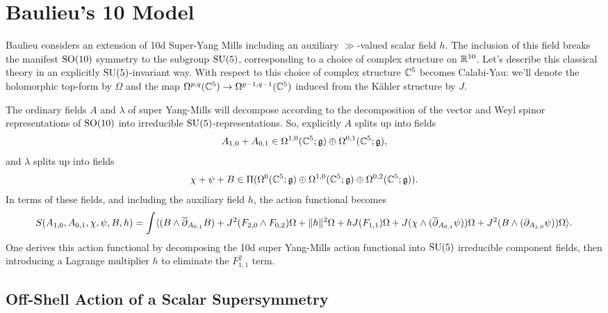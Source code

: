 \documentclass[10pt, oneside]{article}
\begin{document}

\section{Baulieu's 10 Model}

Baulieu \cite{Baulieu} considers an extension of 10d Super-Yang Mills including an auxiliary $\gg$-valued scalar field $h$.  The inclusion of this field breaks the manifest $\mathrm{SO}(10)$ symmetry to the subgroup $\mathrm{SU}(5)$, corresponding to a choice of complex structure on $\mathbb{R}^{10}$.  Let's describe this classical theory in an explicitly $\mathrm{SU}(5)$-invariant way.  With respect to this choice of complex structure $\mathbb{C}^5$ becomes Calabi-Yau: we'll denote the holomorphic top-form by $\Omega$ and the map $\Omega^{p,q}(\mathbb{C}^5) \to \Omega^{p-1,q-1}(\mathbb{C}^5)$ induced from the K\"ahler structure by $J$.

The ordinary fields $A$ and $\lambda$ of super Yang-Mills will decompose according to the decomposition of the vector and Weyl spinor representations of $\mathrm{SO}(10)$ into irreducible $\mathrm{SU}(5)$-representations.  So, explicitly $A$ splits up into fields
\[A_{1,0} + A_{0,1} \in \Omega^{1,0}(\mathbb{C}^5; \mathfrak{g}) \oplus \Omega^{0,1}(\mathbb{C}^5; \mathfrak{g}),\]
and $\lambda$ splits up into fields
\[\chi + \psi + B \in \Pi(\Omega^0(\mathbb{C}^5; \mathfrak{g}) \oplus \Omega^{1,0}(\mathbb{C}^5; \mathfrak{g}) \oplus \Omega^{0,2}(\mathbb{C}^5; \mathfrak{g})).\]
In terms of these fields, and including the auxiliary field $h$, the action functional becomes
\[S(A_{1,0}, A_{0,1}, \chi, \psi, B, h) = \int \langle (B \wedge \overline{\partial}_{A_{0,1}} B) + J^2(F_{2, 0}\wedge F_{0,2})\Omega + \|h\|^2\Omega + h J(F_{1,1}) \Omega + J( \chi \wedge (\overline{\partial}_{A_{0,1}} \psi)) \Omega + J^2(B \wedge (\partial_{A_{1,0}} \psi)) \Omega \rangle.\]
One derives this action functional by decomposing the 10d super Yang-Mills action functional into $\mathrm{SU}(5)$ irreducible component fields, then introducing a Lagrange multiplier $h$ to eliminate the $F_{1,1}^2$ term.

\subsection{Off-Shell Action of a Scalar Supersymmetry}

\end{document}

